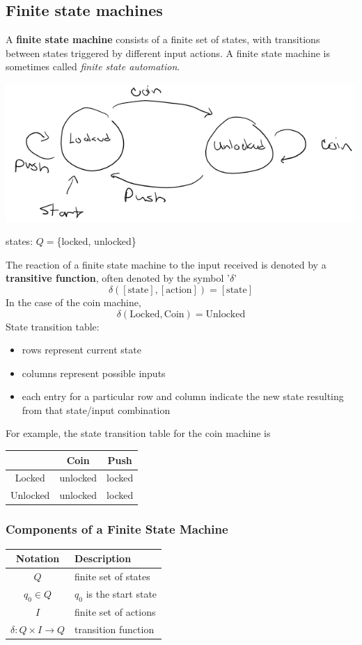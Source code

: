 \subsection{Finite state machines}
A \textbf{finite state machine} consists of a finite set of states,
with transitions between states triggered by different input actions.
A finite state machine is sometimes called \textit{finite state automation}.
\begin{center}
  \includegraphics[width=.6\linewidth]{resources/coin_push.png}

  states: $Q =$\{locked, unlocked\}
\end{center}
The reaction of a finite state machine to the input received is denoted by a \textbf{transitive function},
often denoted by the symbol '$\delta$'
\[
  \delta([\text{state}],[\text{action}]) = [\text{state}]
\]
In the case of the coin machine,
\[
  \delta(\text{Locked}, \text{Coin}) = \text{Unlocked}
\]
State transition table:
\begin{itemize}
  \item rows represent current state
  \item columns represent possible inputs
  \item each entry for a particular row and column indicate the new state resulting from that state/input combination
\end{itemize}
For example, the state transition table for the coin machine is
\begin{center}
  \begin{tabular}{c|cc}
             & Coin     & Push   \\
    \hline
    Locked   & unlocked & locked \\
    Unlocked & unlocked & locked
  \end{tabular}
\end{center}

\subsubsection*{Components of a Finite State Machine}
\begin{center}
  \begin{tabular}{c|l}
    Notation                           & Description              \\
    \hline
    $Q$                                & finite set of states     \\
    $q_0 \in Q$                        & $q_0$ is the start state \\
    $I$                                & finite set of actions    \\
    $\delta: Q \times I \rightarrow Q$ & transition function
  \end{tabular}
\end{center}

